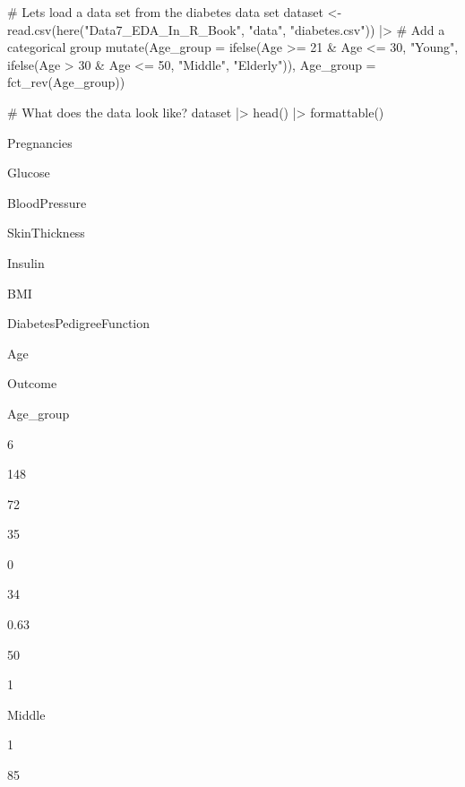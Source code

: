 \documentclass[
  letterpaper,
  DIV=11,
  numbers=noendperiod]{scrreprt}
\newenvironment{Shaded}{\begin{snugshade}}{\end{snugshade}}
\newcommand{\AttributeTok}[1]{\textcolor[rgb]{0.40,0.45,0.13}{#1}}
\newcommand{\CommentTok}[1]{\textcolor[rgb]{0.37,0.37,0.37}{#1}}
\newcommand{\DecValTok}[1]{\textcolor[rgb]{0.68,0.00,0.00}{#1}}
\newcommand{\FunctionTok}[1]{\textcolor[rgb]{0.28,0.35,0.67}{#1}}
\newcommand{\NormalTok}[1]{\textcolor[rgb]{0.00,0.23,0.31}{#1}}
\newcommand{\OtherTok}[1]{\textcolor[rgb]{0.00,0.23,0.31}{#1}}
\newcommand{\SpecialCharTok}[1]{\textcolor[rgb]{0.37,0.37,0.37}{#1}}
\newcommand{\StringTok}[1]{\textcolor[rgb]{0.13,0.47,0.30}{#1}}
\begin{document}
\begin{Shaded}
\begin{Highlighting}[]
\CommentTok{\# Let\textquotesingle{}s load a data set from the diabetes data set}
\NormalTok{dataset }\OtherTok{\textless{}{-}} \FunctionTok{read.csv}\NormalTok{(}\FunctionTok{here}\NormalTok{(}\StringTok{"Data7\_EDA\_In\_R\_Book"}\NormalTok{, }\StringTok{"data"}\NormalTok{, }\StringTok{"diabetes.csv"}\NormalTok{)) }\SpecialCharTok{|\textgreater{}}
  \CommentTok{\# Add a categorical group}
  \FunctionTok{mutate}\NormalTok{(}\AttributeTok{Age\_group =} \FunctionTok{ifelse}\NormalTok{(Age }\SpecialCharTok{\textgreater{}=} \DecValTok{21} \SpecialCharTok{\&}\NormalTok{ Age }\SpecialCharTok{\textless{}=} \DecValTok{30}\NormalTok{, }\StringTok{"Young"}\NormalTok{, }
                            \FunctionTok{ifelse}\NormalTok{(Age }\SpecialCharTok{\textgreater{}} \DecValTok{30} \SpecialCharTok{\&}\NormalTok{ Age }\SpecialCharTok{\textless{}=} \DecValTok{50}\NormalTok{, }\StringTok{"Middle"}\NormalTok{, }
                                   \StringTok{"Elderly"}\NormalTok{)),}
         \AttributeTok{Age\_group =} \FunctionTok{fct\_rev}\NormalTok{(Age\_group))}

\CommentTok{\# What does the data look like?}
\NormalTok{dataset }\SpecialCharTok{|\textgreater{}}
  \FunctionTok{head}\NormalTok{() }\SpecialCharTok{|\textgreater{}}
  \FunctionTok{formattable}\NormalTok{()}
\end{Highlighting}
\end{Shaded}

Pregnancies

Glucose

BloodPressure

SkinThickness

Insulin

BMI

DiabetesPedigreeFunction

Age

Outcome

Age\_group

6

148

72

35

0

34

0.63

50

1

Middle

1

85
\end{document}
